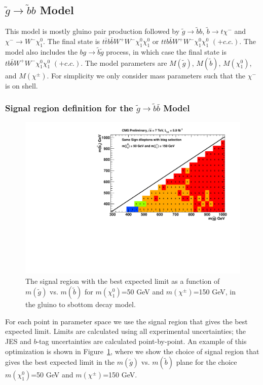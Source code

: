 \subsection{$\widetilde{g} \to \widetilde{b}b$ Model}
\label{sec:gbb}
This model is mostly gluino pair production followed by 
$\widetilde{g} \to \widetilde{b}b$, $\widetilde{b} \to t \chi^{-}$ and
$\chi^{-} \to W^- \chi_1^0$. 
The final state is $t\bar{t}b\bar{b}W^+W^- \chi_1^0 \chi_1^0$
or $ttb\bar{b}W^+W^- \chi_1^0 \chi_1^0$ $(+ c.c.)$.
The model also includes the $b g \to \widetilde{b} \widetilde{g}$ process,
in which case the final state is
$tb\bar{b}W^+W^- \chi_1^0 \chi_1^0$ $(+ c.c.)$. 
The model parameters are $M(\widetilde{g})$,
$M(\widetilde{b})$, $M(\chi_1^0)$, and $M(\chi^{\pm})$.
For simplicity we only consider mass parameters such that the 
$\chi^{-}$ is on shell. 

\subsubsection{Signal region definition for the $\widetilde{g} \to \widetilde{b}\bar{b}$ Model}
\label{sec:gbbdefinition}

\begin{figure}[htb]
\begin{center}
\includegraphics[width=0.49\linewidth]{figs/B2_BestSignalRegion_150.pdf}
\caption{The signal region with the best expected limit as a function of 
$m(\widetilde{g})$ vs. $m(\widetilde{b})$ for $m(\chi^0_1)$=50 GeV
and $m(\chi^{\pm})$=150 GeV, in the gluino to sbottom decay model.
\label{fig:gluinosboptimize}}
\end{center}
\end{figure}


For each point in parameter space we use the signal region that gives
the best expected limit.  
Limits are calculated using all experimental
uncertainties; the JES and $b$-tag uncertainties are calculated point-by-point.
An example of this optimization is shown in Figure~\ref{fig:gluinosboptimize},
where we show the choice of signal region that gives the best expected limit
in the $m(\widetilde{g})$ vs. $m(\widetilde{b})$ plane for the choice
$m(\chi^0_1)$=50 GeV and $m(\chi^{\pm})$=150 GeV. 



